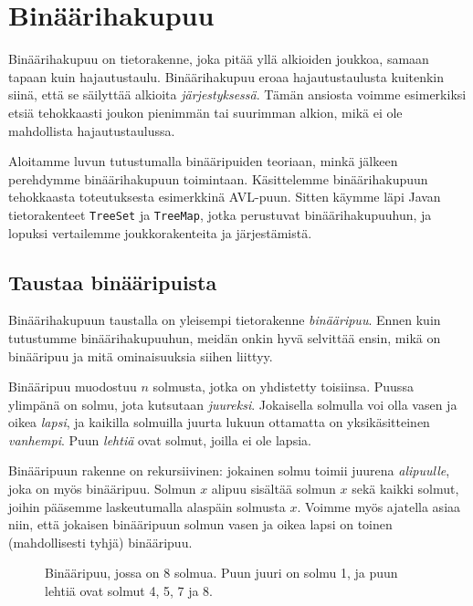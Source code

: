 \chapter{Binäärihakupuu}

Binäärihakupuu on tietorakenne, joka pitää yllä
alkioiden joukkoa, samaan tapaan kuin hajautustaulu.
Binäärihakupuu eroaa hajautustaulusta kuitenkin siinä,
että se säilyttää alkioita \emph{järjestyksessä}.
Tämän ansiosta voimme esimerkiksi etsiä tehokkaasti
joukon pienimmän tai suurimman alkion,
mikä ei ole mahdollista hajautustaulussa.

Aloitamme luvun tutustumalla binääripuiden teoriaan,
minkä jälkeen perehdymme binäärihakupuun toimintaan.
Käsittelemme binäärihakupuun tehokkaasta toteutuksesta
esimerkkinä AVL-puun.
Sitten käymme läpi Javan tietorakenteet
\texttt{TreeSet} ja \texttt{TreeMap}, jotka
perustuvat binäärihakupuuhun,
ja lopuksi vertailemme joukkorakenteita ja järjestämistä.

\section{Taustaa binääripuista}

Binäärihakupuun taustalla on yleisempi tietorakenne \emph{binääripuu}.
Ennen kuin tutustumme binäärihakupuuhun,
meidän onkin hyvä selvittää ensin, mikä on binääripuu ja mitä
ominaisuuksia siihen liittyy.

Binääripuu muodostuu $n$ solmusta, jotka on yhdistetty toisiinsa.
Puussa ylimpänä on solmu, jota kutsutaan \emph{juureksi}.
Jokaisella solmulla voi olla vasen ja oikea \emph{lapsi},
ja kaikilla solmuilla juurta lukuun ottamatta on yksikäsitteinen \emph{vanhempi}.
Puun \emph{lehtiä} ovat solmut, joilla ei ole lapsia.

Binääripuun rakenne on rekursiivinen:
jokainen solmu toimii juurena \emph{alipuulle},
joka on myös binääripuu.
Solmun $x$ alipuu sisältää solmun $x$ sekä kaikki
solmut, joihin pääsemme laskeutumalla alaspäin solmusta $x$.
Voimme myös ajatella asiaa niin, että jokaisen binääripuun
solmun vasen ja oikea lapsi on toinen (mahdollisesti tyhjä) binääripuu.

\begin{figure}
\center
{}
\caption{Binääripuu, jossa on 8 solmua. Puun juuri on solmu 1,
ja puun lehtiä ovat solmut 4, 5, 7 ja 8.}
\label{fig:binpuu}
\end{figure}

